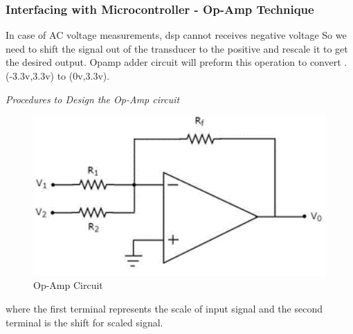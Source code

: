 \documentclass[12pt,a4paper]{book}
\begin{document}
\subsubsection{Interfacing with Microcontroller - Op-Amp Technique}
In case of AC voltage measurements, dsp cannot receives negative voltage So we need to shift the signal out of the transducer to the positive and rescale it to get the desired output. Opamp adder circuit will preform this operation to convert .(-3.3v,3.3v) to (0v,3.3v).

\emph{Procedures to Design the Op-Amp circuit}
\begin{figure}[h!]
  \centering
  \includegraphics[width = 12cm]{image36.png}
  \caption{Op-Amp Circuit}
  \label{fig:image36}
\end{figure}
where the first terminal represents the scale of input signal and the second terminal is the shift for scaled signal.
\end{document}
